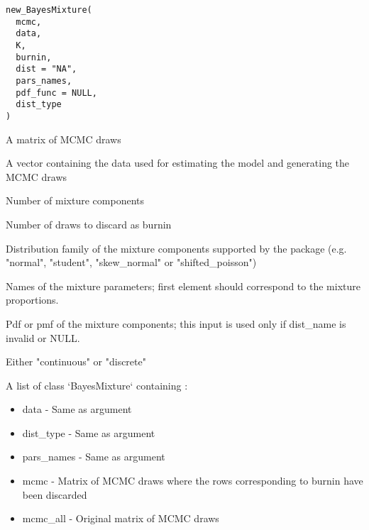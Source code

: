 \documentclass[a4paper]{book}
\begin{document}
%
\begin{Usage}
\begin{verbatim}
new_BayesMixture(
  mcmc,
  data,
  K,
  burnin,
  dist = "NA",
  pars_names,
  pdf_func = NULL,
  dist_type
)
\end{verbatim}
\end{Usage}
%
\begin{Arguments}
\begin{ldescription}
\item[\code{mcmc}] A matrix of MCMC draws

\item[\code{data}] A vector containing the data used for estimating the model and generating the MCMC draws

\item[\code{K}] Number of mixture components

\item[\code{burnin}] Number of draws to discard as burnin

\item[\code{dist}] Distribution family of the mixture components supported by
the package (e.g. "normal", "student", "skew\_normal" or "shifted\_poisson")

\item[\code{pars\_names}] Names of the mixture parameters; first element should 
correspond to the mixture proportions.

\item[\code{pdf\_func}] Pdf or pmf of the mixture components;
this input is used only if dist\_name is invalid or NULL.

\item[\code{dist\_type}] Either "continuous" or "discrete"
\end{ldescription}
\end{Arguments}
%
\begin{Value}
A list of class `BayesMixture` containing :
\begin{itemize}

\item{} data - Same as argument
\item{} dist\_type - Same as argument
\item{} pars\_names - Same as argument
\item{} mcmc - Matrix of MCMC draws where the rows corresponding to burnin have been discarded
\item{} mcmc\_all - Original matrix of MCMC draws

\end{itemize}

\end{Value}
\end{document}
